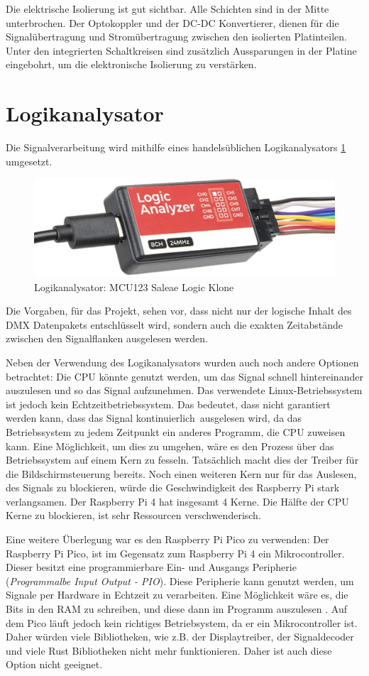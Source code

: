 Die elektrische Isolierung ist gut sichtbar. Alle Schichten sind in der Mitte unterbrochen. Der Optokoppler und der DC-DC Konvertierer, dienen für die Signalübertragung und Stromübertragung zwischen den isolierten Platinteilen. Unter den integrierten Schaltkreisen sind zusätzlich Aussparungen in der Platine eingebohrt, um die elektronische Isolierung zu verstärken.

\section{Logikanalysator}

Die Signalverarbeitung wird mithilfe eines handelsüblichen Logikanalysators \ref{LogicAnalyzer} umgesetzt. 

\begin{figure}[H]
	\centering
	\includegraphics[width=0.6\linewidth]{Pictures/usb-logic-analyzer-side}
	\caption{Logikanalysator: MCU123 Saleae Logic Klone}
	\label{LogicAnalyzer}
\end{figure}


Die Vorgaben, für das Projekt, sehen vor, dass nicht nur der logische Inhalt des DMX Datenpakets entschlüsselt wird, sondern auch die exakten Zeitabstände zwischen den Signalflanken ausgelesen werden.

Neben der Verwendung des Logikanalysators wurden auch noch andere Optionen betrachtet: Die CPU könnte genutzt werden, um das Signal schnell hintereinander auszulesen und so das Signal aufzunehmen. Das verwendete Linux-Betriebssystem ist jedoch kein Echtzeitbetriebssystem. Das bedeutet, dass nicht garantiert werden kann, dass das Signal kontinuierlich ausgelesen wird, da das Betriebssystem zu jedem Zeitpunkt ein anderes Programm, die CPU zuweisen kann. Eine Möglichkeit, um dies zu umgehen, wäre es den Prozess über das Betriebssystem auf einem Kern zu fesseln. Tatsächlich macht dies der Treiber für die Bildschirmsteuerung bereits. Noch einen weiteren Kern nur für das Auslesen, des Signals zu blockieren, würde die Geschwindigkeit des Raspberry Pi stark verlangsamen. Der Raspberry Pi 4 hat insgesamt 4 Kerne. Die Hälfte der CPU Kerne zu blockieren, ist sehr Ressourcen verschwenderisch.

Eine weitere Überlegung war es den Raspberry Pi Pico zu verwenden: Der Raspberry Pi Pico, ist im Gegensatz zum Raspberry Pi 4 ein Mikrocontroller. Dieser besitzt eine programmierbare Ein- und Ausgangs Peripherie (\emph{Programmalbe Input Output - PIO}). Diese Peripherie kann genutzt werden, um Signale per Hardware in Echtzeit zu verarbeiten. Eine Möglichkeit wäre es, die Bits in den RAM zu schreiben, und diese dann im Programm auszulesen \cite[S. 43]{RPiPicoPIO}. Auf dem Pico läuft jedoch kein richtiges Betriebsystem, da er ein Mikrocontroller ist. Daher würden viele Bibliotheken, wie z.B. der Displaytreiber, der Signaldecoder und viele Rust Bibliotheken nicht mehr funktionieren. Daher ist auch diese Option nicht geeignet.

